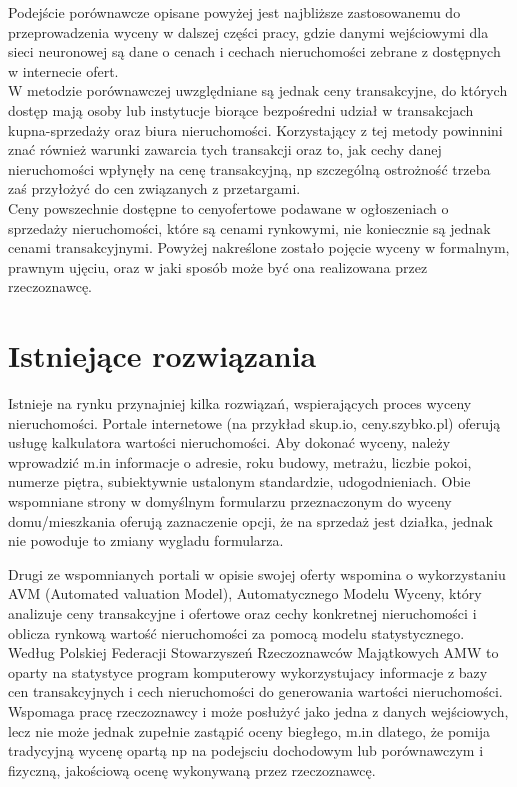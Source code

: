 \documentclass[a4paper,12pt,twoside,openany]{report}
\begin{document}
Podejście porównawcze opisane powyżej jest najbliższe zastosowanemu do przeprowadzenia wyceny w dalszej części pracy, gdzie danymi wejściowymi dla sieci neuronowej są dane o  cenach i cechach nieruchomości zebrane z dostępnych w internecie ofert. \\
W metodzie porównawczej uwzględniane są jednak ceny transakcyjne, do których dostęp mają osoby lub instytucje biorące bezpośredni udział w transakcjach kupna-sprzedaży oraz biura nieruchomości. Korzystający z tej metody powinnini znać również warunki zawarcia tych transakcji  oraz to, jak cechy danej nieruchomości wpłynęły na cenę transakcyjną, np szczególną ostrożność trzeba zaś przyłożyć do cen związanych z przetargami.\\
Ceny powszechnie dostępne to cenyofertowe  podawane w ogłoszeniach o sprzedaży nieruchomości, które są cenami rynkowymi, nie koniecznie są jednak cenami transakcyjnymi.
Powyżej nakreślone zostało pojęcie wyceny w formalnym, prawnym ujęciu, oraz w jaki sposób może być ona realizowana przez rzeczoznawcę.


\section {Istniejące rozwiązania}
Istnieje na rynku przynajniej kilka rozwiązań, wspierających proces wyceny nieruchomości.
Portale internetowe (na przykład skup.io, ceny.szybko.pl) oferują usługę kalkulatora wartości nieruchomości. Aby dokonać wyceny, należy wprowadzić m.in informacje o adresie, roku budowy, metrażu, liczbie pokoi, numerze piętra, subiektywnie ustalonym standardzie, udogodnieniach. Obie wspomniane strony w domyślnym formularzu przeznaczonym do wyceny domu/mieszkania oferują zaznaczenie opcji, że na sprzedaż jest działka, jednak nie powoduje to zmiany wygladu formularza. \cite{skup} \cite{cenyszybko}

Drugi ze wspomnianych portali w opisie swojej oferty wspomina o wykorzystaniu AVM (Automated valuation Model), Automatycznego Modelu Wyceny, który analizuje ceny transakcyjne i ofertowe oraz cechy konkretnej nieruchomości i oblicza rynkową wartość nieruchomości za pomocą modelu statystycznego. \\
Według Polskiej Federacji Stowarzyszeń Rzeczoznawców Majątkowych AMW to oparty na statystyce program komputerowy wykorzystujacy informacje z bazy cen transakcyjnych i cech nieruchomości do generowania wartości nieruchomości. Wspomaga pracę rzeczoznawcy i może posłużyć jako jedna z danych wejściowych, lecz nie może jednak zupełnie zastąpić oceny biegłego, m.in dlatego, że pomija tradycyjną wycenę opartą np na podejsciu dochodowym lub porównawczym i fizyczną, jakościową ocenę wykonywaną przez rzeczoznawcę. \cite{plfed}
\end{document}
